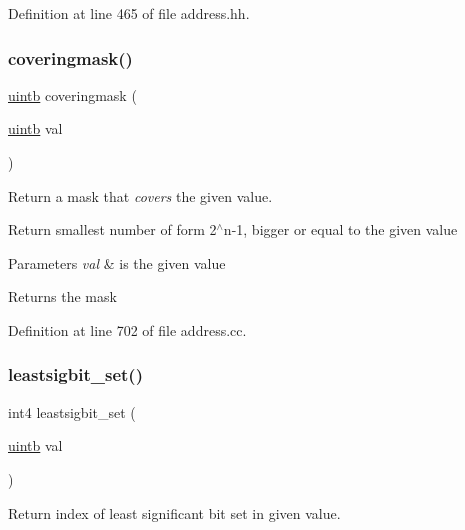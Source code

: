 Definition at line 465 of file address.\+hh.

\mbox{\label{address_8hh_a2564fa4bd27c56892b3673fb40281abe}} 
\subsubsection{\texorpdfstring{coveringmask()}{coveringmask()}}
{\footnotesize\ttfamily \mbox{\hyperlink{types_8h_a2db313c5d32a12b01d26ac9b3bca178f}{uintb}} coveringmask (\begin{DoxyParamCaption}\item[{\mbox{\hyperlink{types_8h_a2db313c5d32a12b01d26ac9b3bca178f}{uintb}}}]{val }\end{DoxyParamCaption})}



Return a mask that {\itshape covers} the given value. 

Return smallest number of form 2$^\wedge$n-\/1, bigger or equal to the given value 
\begin{DoxyParams}{Parameters}
{\em val} & is the given value \\
\hline
\end{DoxyParams}
\begin{DoxyReturn}{Returns}
the mask 
\end{DoxyReturn}


Definition at line 702 of file address.\+cc.

\mbox{\label{address_8hh_ac4d874e14dba4c4dabbbdc0a15653755}} 
\subsubsection{\texorpdfstring{leastsigbit\_set()}{leastsigbit\_set()}}
{\footnotesize\ttfamily int4 leastsigbit\+\_\+set (\begin{DoxyParamCaption}\item[{\mbox{\hyperlink{types_8h_a2db313c5d32a12b01d26ac9b3bca178f}{uintb}}}]{val }\end{DoxyParamCaption})}



Return index of least significant bit set in given value. 

